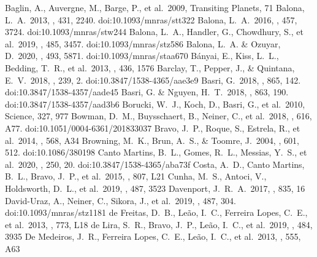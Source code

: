 \documentclass[RNAAS]{aastex63}
\begin{document}
\begin{thebibliography}{}

 Baglin, A., Auvergne, M., Barge, P., et al.\ 2009, Transiting Planets, 71
 Balona, L.~A.\ 2013, \mnras, 431, 2240. doi:10.1093/mnras/stt322
 Balona, L.~A.\ 2016, \mnras, 457, 3724. doi:10.1093/mnras/stw244
 Balona, L.~A., Handler, G., Chowdhury, S., et al.\ 2019, \mnras, 485, 3457. doi:10.1093/mnras/stz586
 Balona, L.~A. \& Ozuyar, D.\ 2020, \mnras, 493, 5871. doi:10.1093/mnras/staa670
 B{\'a}nyai, E., Kiss, L.~L., Bedding, T.~R., et al.\ 2013, \mnras, 436, 1576
 Barclay, T., Pepper, J., \& Quintana, E.~V.\ 2018, \apjs, 239, 2. doi:10.3847/1538-4365/aae3e9
 Basri, G.\ 2018, \apj, 865, 142. doi:10.3847/1538-4357/aade45
 Basri, G. \& Nguyen, H.~T.\ 2018, \apj, 863, 190. doi:10.3847/1538-4357/aad3b6
 Borucki, W.~J., Koch, D., Basri, G., et al.\ 2010, Science, 327, 977
 Bowman, D.~M., Buysschaert, B., Neiner, C., et al.\ 2018, \aap, 616, A77. doi:10.1051/0004-6361/201833037
 Bravo, J.~P., Roque, S., Estrela, R., et al.\ 2014, \aap, 568, A34
 Browning, M.~K., Brun, A.~S., \& Toomre, J.\ 2004, \apj, 601, 512. doi:10.1086/380198
 Canto Martins, B.~L., Gomes, R.~L., Messias, Y.~S., et al.\ 2020, \apjs, 250, 20. doi:10.3847/1538-4365/aba73f
 Costa, A.~D., Canto Martins, B.~L., Bravo, J.~P., et al.\ 2015, \apjl, 807, L21
 Cunha, M.~S., Antoci, V., Holdsworth, D.~L., et al.\ 2019, \mnras, 487, 3523
 Davenport, J.~R.~A.\ 2017, \apj, 835, 16
 David-Uraz, A., Neiner, C., Sikora, J., et al.\ 2019, \mnras, 487, 304. doi:10.1093/mnras/stz1181
 de Freitas, D.~B., Le{\~a}o, I.~C., Ferreira Lopes, C.~E., et al.\ 2013, \apjl, 773, L18
 de Lira, S.~R., Bravo, J.~P., Le{\~a}o, I.~C., et al.\ 2019, \mnras, 484, 3935
 De Medeiros, J.~R., Ferreira Lopes, C.~E., Le{\~a}o, I.~C., et al.\ 2013, \aap, 555, A63

\end{thebibliography}
\end{document}
